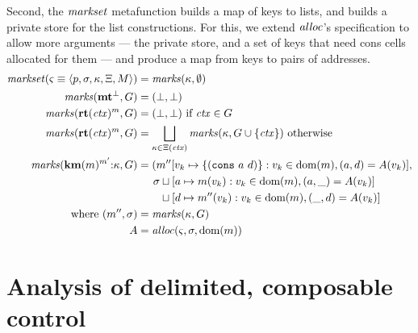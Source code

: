 {Second, the $\mathit{markset}$ metafunction builds a map of keys to lists, and builds a private store for the list constructions.
%
For this, we extend $\mathit{alloc}$'s specification to allow more arguments --- the private store, and a set of keys that need cons cells allocated for them --- and produce a map from keys to pairs of addresses.
%
\newcommand{\markaux}{\mathit{marks}}
\begin{align*}
  \domarkset(\mstate\equiv\tpl{\mpoint,\mstore,\mkont,\mktab,\mmemo}) &= \markaux(\mkont,\emptyset) \\
  \markaux(\kmt^\bot, G) &= (\bot, \bot) \\
  \markaux(\krt{\mctx}^\mmarks, G) &= (\bot, \bot) \text{ if } \mctx \in G \\ %
  \markaux(\krt{\mctx}^\mmarks, G) &= \bigsqcup\limits_{\mkont\in \mktab(\mctx)}{\markaux(\mkont,G \cup \set{\mctx})} \text{ otherwise} \\
  \markaux(\kcons{\kwcm{\mmarks}^{\mmarks'}}{\mkont}, G) &= (\mmarks''[\mval_k \mapsto \set{\cons{a}{d}} : \mval_k \in \dom(\mmarks), (a, d) = A(\mval_k)], \\
    &\phantom{= (}
      \mstore\sqcup[a \mapsto \mmarks(\mval_k) : \mval_k \in \dom(\mmarks), (a,\_) = A(\mval_k)] \\
    &\phantom{= (\mstore}\sqcup[d \mapsto \mmarks''(\mval_k) : \mval_k \in \dom(\mmarks), (\_,d) = A(\mval_k)]
   \\ \text{where } (\mmarks'', \mstore) &= \markaux(\mkont, G)
   \\ A &= \alloc(\mstate, \mstore, \dom(\mmarks))
\end{align*}
}

\section{Analysis of delimited, composable control}
\label{sec:sr}


